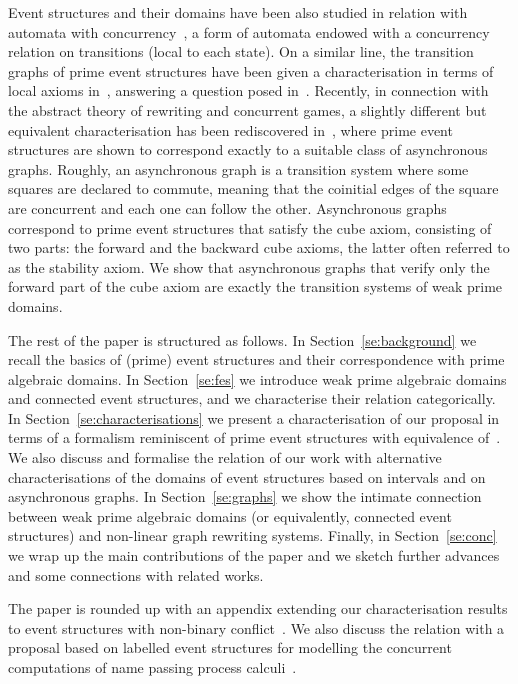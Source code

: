 Event structures and their domains have been also studied in relation
with automata with concurrency~\cite{Dro:CAD,DK:ACRS}, 
a form of automata endowed with a concurrency relation on transitions 
(local to each state).
%
On a similar line, the transition graphs of prime event structures
have been given a characterisation in terms of local axioms
in~\cite{PU:RMC}, answering a question posed in~\cite{SNW:MFCTC}.
%
Recently, in connection with the abstract theory of rewriting and
concurrent games, a slightly different but equivalent characterisation
has been rediscovered in~\cite{Mel:hab}, where prime event structures
are shown to correspond exactly to a suitable class of
asynchronous graphs.
%
Roughly, an asynchronous graph is a transition system where some
squares are declared to commute, meaning that the coinitial edges of
the square are concurrent and each one can follow the
other. Asynchronous graphs correspond to prime event structures that
satisfy the cube axiom, consisting of two parts: the forward
and the backward cube axioms, the latter often referred to as the
stability axiom. We show that asynchronous graphs that verify only the
forward part of the cube axiom are exactly the transition systems of
weak prime domains.

The rest of the paper is structured as follows. In
Section~\ref{se:background} we recall the basics of (prime) event
structures and their correspondence with prime algebraic domains.  In
Section~\ref{se:fes} we introduce weak prime algebraic domains and
connected event structures, and we characterise their relation
categorically.  
%
In Section~\ref{se:characterisations}
we present a characterisation of our proposal 
in terms of a formalism reminiscent of prime event structures with equivalence of~\cite{win2017,VismeW19}.
% 
We also discuss and formalise the relation of our work with alternative  characterisations of the domains of event structures  based on intervals and on asynchronous graphs. 
%
In Section~\ref{se:graphs} we show the intimate connection between
weak prime algebraic domains (or equivalently, connected event
structures) and non-linear graph rewriting systems.
%
Finally, in Section~\ref{se:conc} we wrap up the main contributions of
the paper and we sketch further advances and some connections with
related works.

The paper is rounded up with an appendix extending our characterisation results
to event structures with non-binary conflict~\cite{Dro:ESD}. We also discuss the relation with a  proposal based on labelled event structures for
modelling the concurrent computations of name passing process
calculi~\cite{CVY:ESSPE}.

